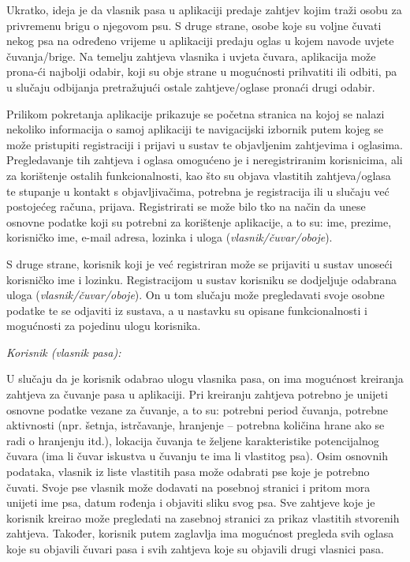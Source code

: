 		Ukratko, ideja je da vlasnik pasa u aplikaciji predaje zahtjev kojim traži osobu za privremenu brigu o njegovom psu. S druge strane, osobe koje su voljne čuvati nekog psa na određeno vrijeme u aplikaciji predaju oglas u kojem navode uvjete čuvanja/brige. Na temelju zahtjeva vlasnika i uvjeta čuvara, aplikacija može prona-ći najbolji odabir, koji su obje strane u mogućnosti prihvatiti ili odbiti, pa u slučaju odbijanja pretražujući  ostale zahtjeve/oglase pronaći drugi odabir. 
		
		Prilikom pokretanja aplikacije prikazuje se početna stranica na kojoj se nalazi nekoliko informacija o samoj aplikaciji te navigacijski izbornik putem kojeg se može pristupiti registraciji i prijavi u sustav te objavljenim zahtjevima i oglasima. Pregledavanje tih zahtjeva i oglasa omogućeno je i neregistriranim korisnicima, ali za korištenje ostalih funkcionalnosti, kao što su objava vlastitih zahtjeva/oglasa te stupanje u kontakt s objavljivačima, potrebna je registracija ili u slučaju već postojećeg računa, prijava. Registrirati se može bilo tko na način da unese osnovne podatke koji su potrebni za korištenje aplikacije, a to su: ime, prezime, korisničko ime, e-mail adresa, lozinka i uloga (\textit{vlasnik/čuvar/oboje}). 
		
		S druge strane, korisnik koji je već registriran može se prijaviti u sustav unoseći korisničko ime i lozinku. Registracijom u sustav korisniku se dodjeljuje odabrana uloga (\textit{vlasnik/čuvar/oboje}). On u tom slučaju može pregledavati svoje osobne podatke te se odjaviti iz sustava, a u nastavku su opisane funkcionalnosti i mogućnosti za pojedinu ulogu korisnika. 
		
		\textit{Korisnik (vlasnik pasa):}
		
		U slučaju da je korisnik odabrao ulogu vlasnika pasa, on ima mogućnost kreiranja zahtjeva za čuvanje pasa u aplikaciji. Pri kreiranju zahtjeva potrebno je unijeti osnovne podatke vezane za čuvanje, a to su: potrebni period čuvanja, potrebne aktivnosti (npr. šetnja, istrčavanje, hranjenje – potrebna količina hrane ako se radi o hranjenju itd.), lokacija čuvanja te željene karakteristike potencijalnog čuvara (ima li čuvar iskustva u čuvanju te ima li vlastitog psa). Osim osnovnih podataka, vlasnik iz liste vlastitih pasa može odabrati pse koje je potrebno čuvati. Svoje pse vlasnik može dodavati na posebnoj stranici i pritom mora unijeti ime psa, datum rođenja i objaviti sliku svog psa. Sve zahtjeve koje je korisnik kreirao može pregledati na zasebnoj stranici za prikaz vlastitih stvorenih zahtjeva. Također, korisnik putem zaglavlja ima mogućnost pregleda svih oglasa koje su objavili čuvari pasa i svih zahtjeva koje su objavili drugi vlasnici pasa.
		

